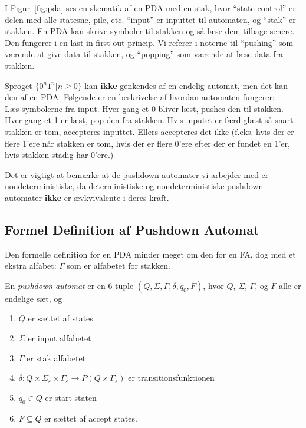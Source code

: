 I Figur~\ref{fig:pda} ses en skematik af en PDA med en stak, hvor ``state control'' er delen med alle statesne, pile, etc. ``input'' er inputtet til automaten, og ``stak'' er stakken. En PDA kan skrive symboler til stakken og så læse dem tilbage senere. Den fungerer i en last-in-first-out princip. Vi referer i noterne til ``pushing'' som værende at give data til stakken, og ``popping'' som værende at læse data fra stakken.

\begin{example}
	Sproget $\{0^{n}1^{n} | n \ge 0\}$ kan \textbf{ikke} genkendes af en endelig automat, men det kan den af en PDA. Følgende er en beskrivelse af hvordan automaten fungerer:\\
	\noindent
	Læs symbolerne fra input. Hver gang et 0 bliver læst, pushes den til stakken. Hver gang et 1 er læst, pop den fra stakken. Hvis inputet er færdiglæst så snart stakken er tom, accepteres inputtet. Ellers accepteres det ikke (f.eks. hvis der er flere 1'ere når stakken er tom, hvis der er flere 0'ere efter der er fundet en 1'er, hvis stakken stadig har 0'ere.)
\end{example}

Det er vigtigt at bemærke at de pushdown automater vi arbejder med er nondeterministiske, da deterministiske og nondeterministiske pushdown automater \textbf{ikke} er ævkvivalente i deres kraft.

\subsection{Formel Definition af Pushdown Automat}%
\label{subsec:formelPDA}

Den formelle definition for en PDA minder meget om den for en FA, dog med et ekstra alfabet: $\Gamma$ som er alfabetet for stakken.

\begin{definition}
	\label{def:pda}
	En \textit{pushdown automat} er en 6-tuple $(Q, \Sigma, \Gamma, \delta, q_{0}, F)$, hvor $Q$, $\Sigma$, $\Gamma$, og $F$ alle er endelige sæt, og
	\begin{enumerate}
		\item $Q$ er sættet af states
		\item $\Sigma$ er input alfabetet
		\item $\Gamma$ er stak alfabetet
		\item $\delta : Q \times \Sigma_{\varepsilon} \times \Gamma_{\varepsilon} \longrightarrow P(Q \times \Gamma_{\varepsilon})$ er transitionsfunktionen
		\item $q_{0} \in Q$ er start staten
		\item $F \subseteq Q$ er sættet af accept states.
	\end{enumerate}
\end{definition}

